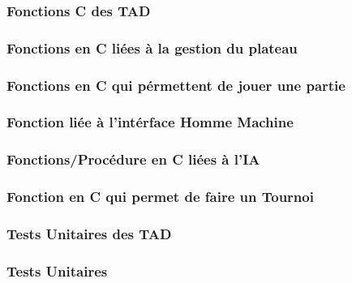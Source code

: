 \subsubsection{Fonctions C des TAD}







\subsubsection{Fonctions en C liées à la gestion du plateau}



\subsubsection{Fonctions en C qui pérmettent de jouer une partie}











\subsubsection{Fonction liée à l'intérface Homme Machine}


\subsubsection{Fonctions/Procédure en C liées à l'IA}







\subsubsection{Fonction en C qui permet de faire un Tournoi}



\subsubsection{Tests Unitaires des TAD}



\subsubsection{ Tests Unitaires}







